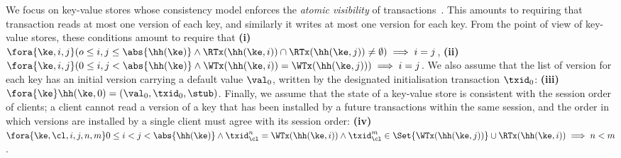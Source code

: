 We focus on key-value stores whose consistency model enforces the \emph{atomic visibility} of transactions~\cite{framework-concur}. 
This amounts to requiring that transaction reads at most one version of each key, and similarly 
it writes at most one version for each key. From the point of view of key-value stores, 
these conditions amount to require that \textbf{(i)}
$\fora{\ke, i, j} (o \leq i, j \leq \abs{ \hh(\ke) } \land \RTx(\hh(\ke, i)) \cap \RTx(\hh(\ke, j)) \neq \emptyset ) \implies i = j$, 
\textbf{(ii)}
$\fora{\ke, i, j} (0 \leq i,j < \abs{ \hh(\ke) } \wedge \WTx(\hh(\ke, i)) = \WTx(\hh(\ke, j)) ) \implies i = j$. 
We also assume that the list of version for each key has an initial version carrying a default value $\val_0$, 
written by the designated initialisation transaction $\txid_0$: \textbf{(iii)} $\fora{\ke} \hh(\ke, 0) = (\val_0, \txid_0, \stub)$.
Finally, we assume that the state of a key-value store is consistent with 
the session order of clients; a client cannot read a version of a key that has 
been installed by a future transactions within the same session, and 
the order in which versions are installed by a single client must agree 
with its session order: \textbf{(iv)}
$\fora{ \ke, \cl, i,j, n, m} 0 \leq i < j < \abs{\hh(\ke)} 
    \land \txid_{\cl}^{n} = \WTx(\hh(\ke,i)) {} \wedge \txid_{\cl}^{m} \in \Set{\WTx(\hh(\ke,j))} \cup \RTx(\hh(\ke, i))
    \implies n < m $.
%
%
